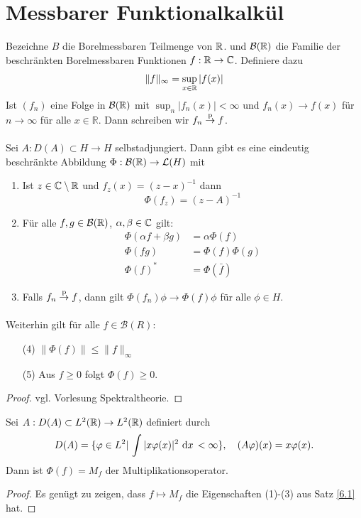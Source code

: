 \documentclass{mycourse}
\begin{document}
\section{Messbarer Funktionalkalkül}
Bezeichne $B$ die Borelmessbaren Teilmenge von $\mathbb{R}$. und $\mathcal B(\mathbb{R})$ die Familie der beschränkten Borelmessbaren Funktionen $f: \mathbb{R} \to \mathbb{C}$. Definiere dazu
\[
\| f\|_\infty = \sup_{x\in \mathbb{R}} |f(x)|
\]
Ist $(f_n)$ eine Folge in $\mathcal B(\mathbb{R})$ mit $\sup_{n} |f_n(x)| < \infty$ und $f_n(x) \to f(x)$ für $n\to \infty$ für alle $x\in \mathbb R$. Dann schreiben wir $f_n \stack{\text{p}}\to f$.
\begin{st}\label{6.1}
Sei $A:D(A) \subset H \to H$ selbstadjungiert. Dann gibt es eine eindeutig beschränkte Abbildung $\Phi: \mathcal B(\mathbb{R}) \to \mathcal L(H)$ mit
\begin{enumerate}[(1)]
\item Ist $z\in \mathbb{C}\setminus\mathbb{R}$ und $f_z(x) = (z-x)^{-1}$ dann
\[
\Phi(f_z) =(z-A)^{-1}
\]
\item Für alle $f,g \in \mathcal B(\mathbb{R})$, $\alpha, \beta\in \mathbb{C}$ gilt:
\begin{align*}
\Phi(\alpha f + \beta g)&= \alpha \Phi(f)\\
\Phi(fg) &= \Phi(f) \Phi(g)\\
\Phi(f)^* &= \Phi(\bar f)
\end{align*}
\item Falls $f_n \stack{\text{p}}\to f$, dann gilt $\Phi(f_n) \phi \to \Phi(f) \phi$ für alle $\phi \in H$.
\end{enumerate}
Weiterhin gilt für alle $f\in \mathcal B(R)$:
\begin{enumerate}
\item[(4)] $\| \Phi(f)\| \le \|f\|_\infty$
\item[(5)] Aus $f\ge 0$ folgt $\Phi(f) \ge 0$. 
\end{enumerate}
\end{st}
\begin{proof}
vgl. Vorlesung Spektraltheorie. %
\end{proof}

\begin{ex*}
Sei $A: D(A) \subset L^2(\mathbb{R})\to L^2(\mathbb{R})$ definiert durch
\[
D(A) = \{\varphi \in L^2|\, \int |x\varphi(x)|^2 \, \,\mathrm{d}x\, <\infty\}, \quad (A\varphi) (x) = x \varphi(x).
\]
Dann ist $\Phi(f)=M_f$ der Multiplikationsoperator.
\end{ex*}
\begin{proof}
Es genügt zu zeigen, dass $f\mapsto M_f$ die Eigenschaften (1)-(3) aus Satz \ref{6.1} hat.
\end{proof}
\end{document}
